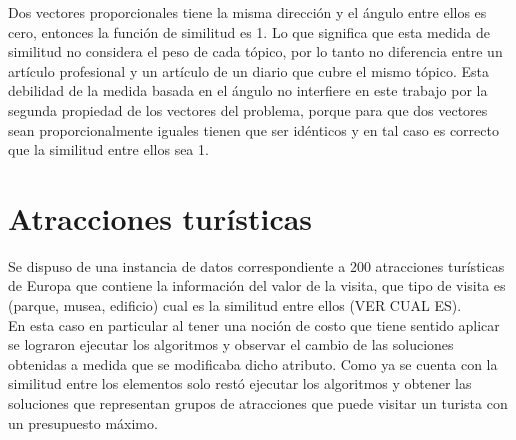 Dos vectores proporcionales tiene la misma dirección y el ángulo entre ellos es cero, entonces la función de similitud es 1. Lo que significa que esta medida de similitud no considera el peso de cada tópico, por lo tanto no diferencia entre un artículo profesional y un artículo de un diario que cubre el mismo tópico. Esta debilidad de la medida basada en el ángulo no interfiere en este trabajo por la segunda propiedad de los vectores del problema, porque para que dos vectores sean proporcionalmente iguales tienen que ser idénticos y en tal caso es correcto que la similitud entre ellos sea 1.
\section{Atracciones turísticas}
Se dispuso de una instancia de datos correspondiente a 200 atracciones turísticas de Europa que contiene la información del valor de la visita, que tipo de visita es (parque, musea, edificio) cual es la similitud entre ellos (VER CUAL ES).\\
En esta caso en particular al tener una noción de costo que tiene sentido aplicar se lograron ejecutar los algoritmos y observar el cambio de las soluciones obtenidas a medida que se modificaba dicho atributo. Como ya se cuenta con la similitud entre los elementos solo restó ejecutar los algoritmos y obtener las soluciones que representan grupos de atracciones que puede visitar un turista con un presupuesto máximo.